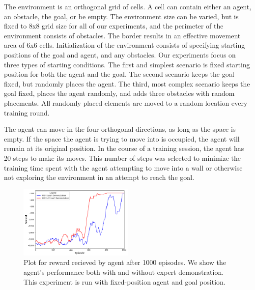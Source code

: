 \documentclass[conference]{IEEEtran}
\begin{document}
The environment is an orthogonal grid of cells. A cell can contain either an
agent, an obstacle, the goal, or be empty. The environment size can be varied,
but is fixed to 8x8 grid size for all of our experiments, and the perimeter of
the environment consists of obstacles. The border results in an effective
movement area of 6x6 cells. Initialization of the environment consists of
specifying starting positions of the goal and agent, and any obstacles. Our
experiments focus on three types of starting conditions. The first and simplest
scenario is fixed starting position for both the agent and the goal. The second
scenario keeps the goal fixed, but randomly places the agent. The third, most
complex scenario keeps the goal fixed, places the agent randomly, and adds three
obstacles with random placements. All randomly placed elements are moved to a
random location every training round.

The agent can move in the four orthogonal directions, as long as the space is
empty. If the space the agent is trying to move into is occupied, the agent will
remain at its original position. In the course of a training session, the agent
has 20 steps to make its moves. This number of steps was selected to minimize
the training time spent with the agent attempting to move into a wall or
otherwise not exploring the environment in an attempt to reach the goal.

\begin{figure}
    \centering
    \includegraphics[width=0.5\textwidth]{assets/expertdemonstration.png}
    \caption{Plot for reward recieved by agent after 1000 episodes.
        We show the agent's performance both with and without expert demonstration.
        This experiment is run with fixed-position agent and goal position.}
    \label{fig:expertdemonstration}
\end{figure}
\end{document}
